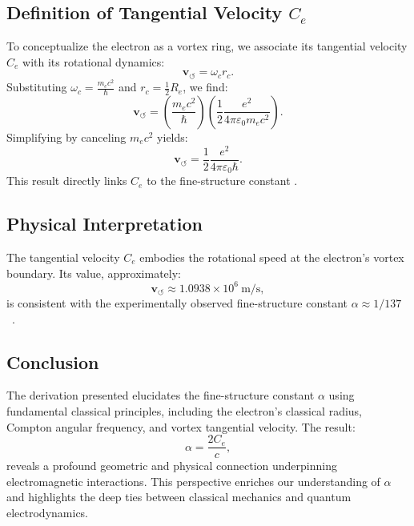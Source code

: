     \subsection*{Definition of Tangential Velocity $C_e$}
    To conceptualize the electron as a vortex ring, we associate its tangential velocity $C_e$ with its rotational dynamics:
    \begin{equation*}
        \mathbf{v}_{\scriptscriptstyle\boldsymbol{\circlearrowleft}} = \omega_c r_c.
    \end{equation*}
    Substituting $\omega_c = \frac{m_e c^2}{\hbar}$ and $r_c = \frac{1}{2} R_e$, we find:
    \begin{equation*}
        \mathbf{v}_{\scriptscriptstyle\boldsymbol{\circlearrowleft}} = \left( \frac{m_e c^2}{\hbar} \right) \left( \frac{1}{2} \frac{e^2}{4\pi \varepsilon_0 m_e c^2} \right).
    \end{equation*}
    Simplifying by canceling $m_e c^2$ yields:
    \begin{equation*}
        \mathbf{v}_{\scriptscriptstyle\boldsymbol{\circlearrowleft}} = \frac{1}{2} \frac{e^2}{4\pi \varepsilon_0 \hbar}.\label{eq:C_e-from-compton}
    \end{equation*}
    This result directly links $C_e$ to the fine-structure constant \cite{vinen2024}.

    \subsection*{Physical Interpretation}
    The tangential velocity $C_e$ embodies the rotational speed at the electron's vortex boundary. Its value, approximately:
    \begin{equation*}
        \mathbf{v}_{\scriptscriptstyle\boldsymbol{\circlearrowleft}} \approx 1.0938 \times 10^6 \ \text{m/s},
    \end{equation*}
    is consistent with the experimentally observed fine-structure constant $\alpha \approx 1/137$~\cite{ricca1998}.

    \subsection*{Conclusion}
    The derivation presented elucidates the fine-structure constant $\alpha$ using fundamental classical principles, including the electron's classical radius, Compton angular frequency, and vortex tangential velocity. The result:
    \begin{equation*}
        \alpha = \frac{2 C_e}{c},
    \end{equation*}
    reveals a profound geometric and physical connection underpinning electromagnetic interactions.
    This perspective enriches our understanding of $\alpha$ and highlights the deep ties between classical mechanics and quantum electrodynamics.



